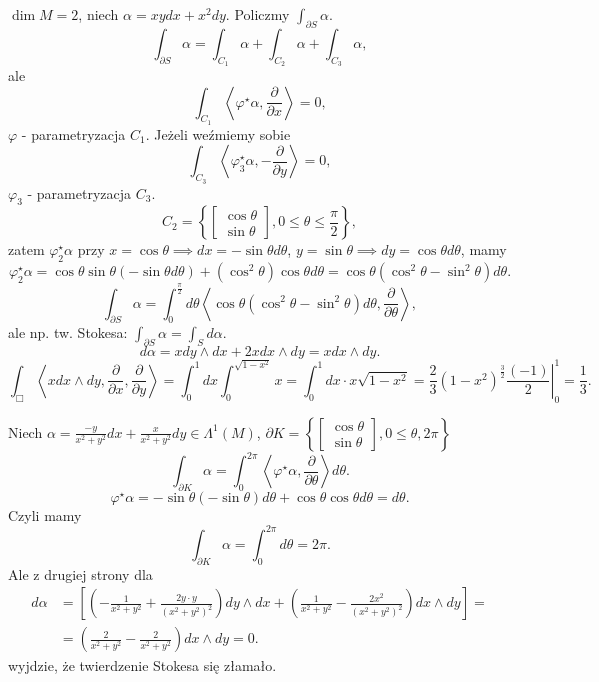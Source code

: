 \documentclass[../main.tex]{subfiles}
\begin{document}
\begin{przyklad}
    $\dim M = 2$, niech $\alpha = xydx + x^2dy$. Policzmy $\int_{\partial S}\alpha$.
    \[
    \int_{\partial S}\alpha = \int_{C_1}\alpha + \int_{C_2}\alpha + \int_{C_3}\alpha
    ,\]
ale
    \[
        \int_{C_1}\left<\varphi^\star\alpha, \frac{\partial }{\partial x}  \right> = 0
    ,\]
$\varphi$ - parametryzacja $C_1$. Jeżeli weźmiemy sobie
\[
\int_{C_3}\left<\varphi_3^\star\alpha, - \frac{\partial }{\partial y}  \right> = 0
,\]
$\varphi_3$ - parametryzacja $C_3$.
\[
    C_2 = \left\{ \begin{bmatrix} \cos\theta\\ \sin\theta \end{bmatrix}, 0\le \theta \le \frac{\pi}{2}  \right\}
,\]
zatem $\varphi_2^\star\alpha$ przy $x = \cos\theta \implies dx = -\sin\theta d\theta$, $y = \sin\theta \implies dy = \cos\theta d\theta$, mamy
\[
    \varphi_2^\star \alpha = \cos\theta \sin\theta(-\sin\theta d\theta) + (\cos^2\theta)\cos\theta d\theta = \cos\theta(\cos^2\theta - \sin^2\theta)d\theta
.\]
\[
    \int_{\partial S}\alpha = \int_0^{\frac{\pi}{2}}d\theta \left<\cos\theta(\cos^2\theta - \sin^2\theta)d\theta, \frac{\partial }{\partial \theta}  \right>
,\]
ale np. tw. Stokesa: $\int_{\partial S}\alpha = \int_S d\alpha$.
\[
d\alpha = xdy\land dx + 2xdx\land dy = xdx\land dy
.\]
\[
    \int_{\Box}\left<xdx\land dy, \frac{\partial }{\partial x} , \frac{\partial }{\partial y}  \right> = \int_0^1dx\int_0^{\sqrt{1-x^2} } x = \int_0^1dx \cdot x\sqrt{1-x^2} = \left.\frac{2}{3}(1-x^2)^{\frac{3}{2}}\frac{(-1)}{2}\right|_0^1 = \frac{1}{3}
.\]
\end{przyklad}
\begin{przyklad}
    Niech $\alpha = \frac{-y}{x^2+y^2}dx + \frac{x}{x^2+y^2}dy\in \Lambda^1(M)$, $\partial K = \left\{ \begin{bmatrix} \cos\theta\\ \sin\theta \end{bmatrix} , 0\le \theta, 2\pi \right\} $
    \[
        \int_{\partial K}\alpha = \int_0^{2\pi}\left<\varphi^\star\alpha, \frac{\partial }{\partial \theta} \right>d\theta
    .\]
\[
    \varphi^\star \alpha = -\sin\theta(-\sin\theta)d\theta + \cos\theta\cos\theta d\theta = d\theta
.\]
Czyli mamy
\[
\int_{\partial K}\alpha = \int_0^{2\pi}d\theta = 2\pi
.\]
Ale z drugiej strony dla
    \begin{align*}
        d\alpha &= \left[ \left( -\frac{1}{x^2+y^2} + \frac{2y\cdot y}{(x^2+y^2)^2} \right) dy\land dx + \left( \frac{1}{x^2+y^2} - \frac{2x^2}{(x^2+y^2)^2} \right) dx\land dy \right] = \\
        &= \left( \frac{2}{x^2 + y^2} - \frac{2}{x^2+y^2} \right) dx\land dy = 0
    .\end{align*}
     wyjdzie, że twierdzenie Stokesa się złamało.
\end{przyklad}
\end{document}
